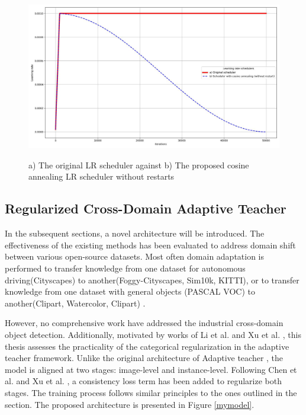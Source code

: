 \begin{figure}[htb]
	\begin{center}
		\includegraphics[width=14cm]{./LR.jpg}
	\end{center}
	\caption{a) The original LR scheduler against b) The proposed cosine annealing LR scheduler without restarts}
	\begin{center}
		\label{annealing}
	\end{center}
\end{figure}
\FloatBarrier

\subsection{Regularized Cross-Domain Adaptive Teacher}
\label{mainExperiments} 
In the subsequent sections, a novel architecture will be introduced. The effectiveness of the existing methods has been evaluated to address domain shift  between various open-source datasets. Most often domain adaptation is performed to transfer knowledge from one dataset for autonomous driving(Cityscapes) to another(Foggy-Cityscapes, Sim10k, KITTI), or to transfer knowledge from one dataset with general objects (PASCAL VOC) to another(Clipart, Watercolor, Clipart) \cite{Oza2021}.  

However, no comprehensive work have addressed the industrial cross-domain object detection. Additionally, motivated by works of Li et al. \cite{Li2021} and Xu et al. \cite{Xu2020}, this thesis assesses the practicality of the categorical regularization in the adaptive teacher framework. Unlike the original architecture of Adaptive teacher \cite{Li2021}, the model is aligned at two stages:  image-level and instance-level. Following Chen et al. \cite{Chen2018} and Xu et al. \cite{Xu2020}, a consistency loss term has been added to regularize both stages. The training process follows similar principles to the ones outlined in the  section. The proposed architecture is presented in Figure \ref{mymodel}. 

